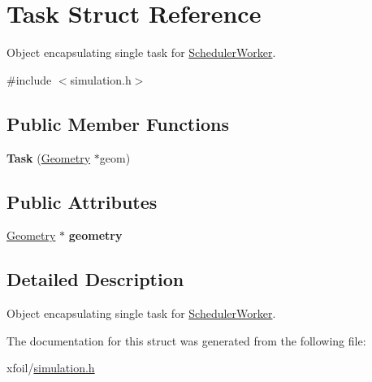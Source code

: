 \hypertarget{struct_task}{}\section{Task Struct Reference}
\label{struct_task}


Object encapsulating single task for \hyperlink{class_scheduler_worker}{Scheduler\+Worker}.  




{\ttfamily \#include $<$simulation.\+h$>$}

\subsection*{Public Member Functions}
\begin{DoxyCompactItemize}
\item 
\mbox{\label{struct_task_a065fcc943559671cefeb383652bc30fd}} 
{\bfseries Task} (\hyperlink{class_geometry}{Geometry} $\ast$geom)
\end{DoxyCompactItemize}
\subsection*{Public Attributes}
\begin{DoxyCompactItemize}
\item 
\mbox{\label{struct_task_a76af73b7a72c92cfc7ca31c88783f7df}} 
\hyperlink{class_geometry}{Geometry} $\ast$ {\bfseries geometry}
\end{DoxyCompactItemize}


\subsection{Detailed Description}
Object encapsulating single task for \hyperlink{class_scheduler_worker}{Scheduler\+Worker}. 

The documentation for this struct was generated from the following file\+:\begin{DoxyCompactItemize}
\item 
xfoil/\hyperlink{simulation_8h}{simulation.\+h}\end{DoxyCompactItemize}

